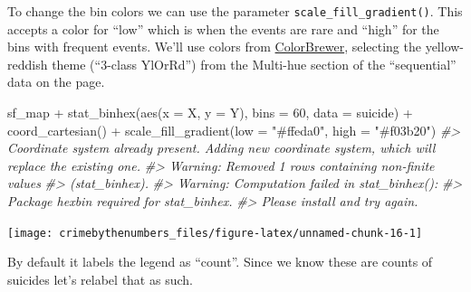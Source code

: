 \documentclass[
  12pt,
  openany]{book}
\newenvironment{Shaded}{\begin{snugshade}}{\end{snugshade}}
\newcommand{\AttributeTok}[1]{\textcolor[rgb]{0.61,0.61,0.61}{#1}}
\newcommand{\CommentTok}[1]{\textcolor[rgb]{0.37,0.37,0.37}{\textit{#1}}}
\newcommand{\DecValTok}[1]{\textcolor[rgb]{0.06,0.06,0.06}{#1}}
\newcommand{\FunctionTok}[1]{\textcolor[rgb]{0,0,0}{#1}}
\newcommand{\NormalTok}[1]{#1}
\newcommand{\SpecialCharTok}[1]{\textcolor[rgb]{0,0,0}{#1}}
\newcommand{\StringTok}[1]{\textcolor[rgb]{0.5,0.5,0.5}{#1}}
\begin{document}
To change the bin colors we can use the parameter \texttt{scale\_fill\_gradient()}. This accepts a color for ``low'' which is when the events are rare and ``high'' for the bins with frequent events. We'll use colors from \href{http://colorbrewer2.org}{ColorBrewer}, selecting the yellow-reddish theme (``3-class YlOrRd'') from the Multi-hue section of the ``sequential'' data on the page.

\begin{Shaded}
\begin{Highlighting}[]
\NormalTok{sf\_map }\SpecialCharTok{+}
  \FunctionTok{stat\_binhex}\NormalTok{(}\FunctionTok{aes}\NormalTok{(}\AttributeTok{x =}\NormalTok{ X, }\AttributeTok{y =}\NormalTok{ Y),}
              \AttributeTok{bins  =} \DecValTok{60}\NormalTok{,}
              \AttributeTok{data =}\NormalTok{ suicide) }\SpecialCharTok{+}
  \FunctionTok{coord\_cartesian}\NormalTok{() }\SpecialCharTok{+}
  \FunctionTok{scale\_fill\_gradient}\NormalTok{(}\AttributeTok{low =} \StringTok{"\#ffeda0"}\NormalTok{,}
                      \AttributeTok{high =} \StringTok{"\#f03b20"}\NormalTok{)}
\CommentTok{\#\textgreater{} Coordinate system already present. Adding new coordinate system, which will replace the existing one.}
\CommentTok{\#\textgreater{} Warning: Removed 1 rows containing non{-}finite values}
\CommentTok{\#\textgreater{} (stat\_binhex).}
\CommentTok{\#\textgreater{} Warning: Computation failed in \textasciigrave{}stat\_binhex()\textasciigrave{}:}
\CommentTok{\#\textgreater{}   Package \textasciigrave{}hexbin\textasciigrave{} required for \textasciigrave{}stat\_binhex\textasciigrave{}.}
\CommentTok{\#\textgreater{}   Please install and try again.}
\end{Highlighting}
\end{Shaded}

\begin{center}\texttt{[image: crimebythenumbers\_files/figure-latex/unnamed-chunk-16-1]} \end{center}

By default it labels the legend as ``count''. Since we know these are counts of suicides let's relabel that as such.
\end{document}
